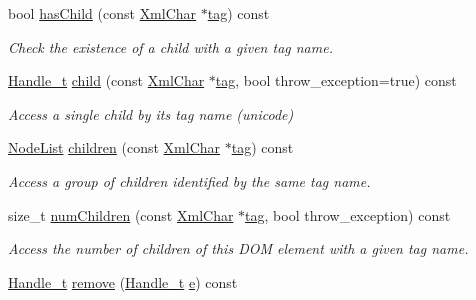 \begin{DoxyCompactItemize}
bool \hyperlink{class_d_d4hep_1_1_x_m_l_1_1_handle__t_a605736e21de11d2834826d882b2941f3}{has\+Child} (const \hyperlink{namespace_d_d4hep_1_1_x_m_l_a09e5d9cc86ed782f6826dfe0778c1815}{Xml\+Char} $\ast$\hyperlink{class_d_d4hep_1_1_x_m_l_1_1_handle__t_ac935379eb28cd33bc36f19c68da66143}{tag}) const
\begin{DoxyCompactList}\small\item\em Check the existence of a child with a given tag name. \end{DoxyCompactList}\item 
\hyperlink{class_d_d4hep_1_1_x_m_l_1_1_handle__t}{Handle\+\_\+t} \hyperlink{class_d_d4hep_1_1_x_m_l_1_1_handle__t_aba89b01b45f745b58bf27c9463f05742}{child} (const \hyperlink{namespace_d_d4hep_1_1_x_m_l_a09e5d9cc86ed782f6826dfe0778c1815}{Xml\+Char} $\ast$\hyperlink{class_d_d4hep_1_1_x_m_l_1_1_handle__t_ac935379eb28cd33bc36f19c68da66143}{tag}, bool throw\+\_\+exception=true) const
\begin{DoxyCompactList}\small\item\em Access a single child by it\textquotesingle{}s tag name (unicode) \end{DoxyCompactList}\item 
\hyperlink{class_d_d4hep_1_1_x_m_l_1_1_node_list}{Node\+List} \hyperlink{class_d_d4hep_1_1_x_m_l_1_1_handle__t_aa27483dcfe272afb4ce560a5e45998f1}{children} (const \hyperlink{namespace_d_d4hep_1_1_x_m_l_a09e5d9cc86ed782f6826dfe0778c1815}{Xml\+Char} $\ast$\hyperlink{class_d_d4hep_1_1_x_m_l_1_1_handle__t_ac935379eb28cd33bc36f19c68da66143}{tag}) const
\begin{DoxyCompactList}\small\item\em Access a group of children identified by the same tag name. \end{DoxyCompactList}\item 
size\+\_\+t \hyperlink{class_d_d4hep_1_1_x_m_l_1_1_handle__t_ad9e37cc353a2144b43db84d461cbcf1b}{num\+Children} (const \hyperlink{namespace_d_d4hep_1_1_x_m_l_a09e5d9cc86ed782f6826dfe0778c1815}{Xml\+Char} $\ast$\hyperlink{class_d_d4hep_1_1_x_m_l_1_1_handle__t_ac935379eb28cd33bc36f19c68da66143}{tag}, bool throw\+\_\+exception) const
\begin{DoxyCompactList}\small\item\em Access the number of children of this D\+OM element with a given tag name. \end{DoxyCompactList}\item 
\hyperlink{class_d_d4hep_1_1_x_m_l_1_1_handle__t}{Handle\+\_\+t} \hyperlink{class_d_d4hep_1_1_x_m_l_1_1_handle__t_a922e6bedf1cb36a5b5636241f8eae557}{remove} (\hyperlink{class_d_d4hep_1_1_x_m_l_1_1_handle__t}{Handle\+\_\+t} \hyperlink{_volumes_8cpp_a8a9a1f93e9b09afccaec215310e64142}{e}) const

\end{DoxyCompactItemize}
